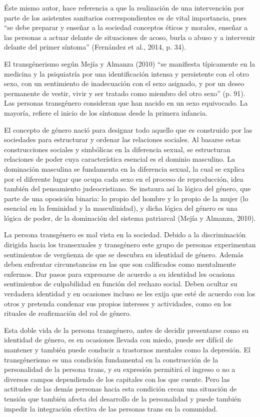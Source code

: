 Éste mismo autor, hace referencia a que la realización de una intervención por
parte de los asistentes sanitarios correspondientes es de vital importancia,
pues “se debe preparar y enseñar a la sociedad conceptos éticos y morales,
enseñar a las personas a actuar delante de situaciones de acoso, burla o abuso y
a intervenir delante del primer síntoma” (Fernández et al., 2014, p. 34).

El transgénerismo según Mejía y Almanza (2010) “se manifiesta típicamente en la
medicina y la psiquiatría por una identificación intensa y persistente con el
otro sexo, con un sentimiento de inadecuación con el sexo asignado, y por un
deseo permanente de vestir, vivir y ser tratado como miembro del otro sexo” (p.
91). Las personas transgénero consideran que han nacido en un sexo equivocado.
La mayoría, refiere el inicio de los síntomas desde la primera infancia.

El concepto de género nació para designar todo aquello que es construido por las
sociedades para estructurar y ordenar las relaciones sociales. Al basarse estas
construcciones sociales y simbólicas en la diferencia sexual, se estructuran
relaciones de poder cuya característica esencial es el dominio masculino. La
dominación masculina se fundamenta en la diferencia sexual, la cual se explica
por el diferente lugar que ocupa cada sexo en el proceso de reproducción, idea
también del pensamiento judeocristiano. Se instaura así la lógica del género,
que parte de una oposición binaria: lo propio del hombre y lo propio de la mujer
(lo esencial en la feminidad y la masculinidad), y dicha lógica del género es
una lógica de poder, de la dominación del sistema patriarcal (Mejía y Almanza,
2010).

La persona transgénero es mal vista en la sociedad. Debido a la discriminación
dirigida hacia los transexuales y transgénero este grupo de personas
experimentan sentimientos de vergüenza de que se descubra su identidad de
género. Además deben enfrentar circunstancias en las que son calificados como
mentalmente enfermos. Dar pasos para expresarse de acuerdo a su identidad les
ocasiona sentimientos de culpabilidad en función del rechazo social. Deben
ocultar su verdadera identidad y en ocasiones incluso se les exija que esté de
acuerdo con los otros y pretenda condenar sus propios intereses y actividades,
como en los rituales de reafirmación del rol de género.

Esta doble vida de la persona transgénero, antes de decidir presentarse como su
identidad de género, es en ocasiones llevada con miedo, puede ser difícil de
mantener y también puede conducir a trastornos mentales como la depresión. El
transgénerismo es una condición fundamental en la construcción de la
personalidad de la persona trans, y su expresión permitirá el ingreso o no a
diversos campos dependiendo de los capitales con los que cuente. Pero las
actitudes de las demás personas hacia esta condición crean una situación de
tensión que también afecta del desarrollo de la personalidad y puede también
impedir la integración efectiva de las personas trans en la comunidad.

